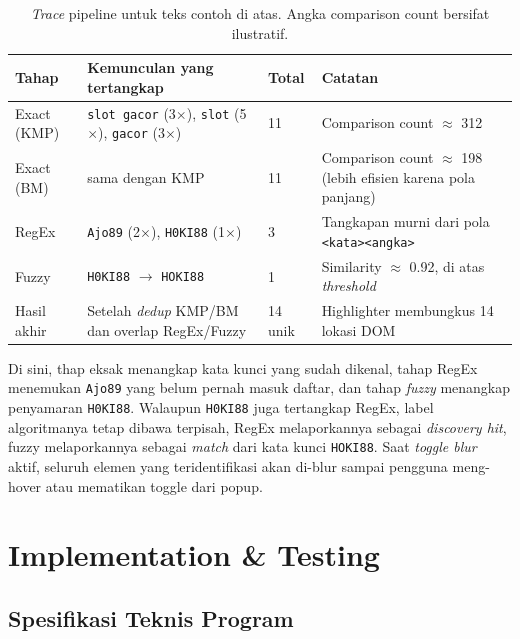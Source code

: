 \documentclass[11pt,a4paper]{article}
\begin{document}
\begin{table}[H]
    \centering
    \caption{\textit{Trace} pipeline untuk teks contoh di atas. Angka comparison count bersifat ilustratif.}
    \label{tab:case-trace}
    \begin{tabularx}{\textwidth}{p{2.4cm}|X|p{2cm}|p{3cm}}
        \toprule
        \textbf{Tahap} & \textbf{Kemunculan yang tertangkap} & \textbf{Total} & \textbf{Catatan} \\
        \midrule
        Exact (KMP) & \texttt{slot gacor} (3$\times$), \texttt{slot} (5$\times$), \texttt{gacor} (3$\times$) & 11 &
        Comparison count $\approx$ 312 \\
        Exact (BM) & sama dengan KMP & 11 & Comparison count $\approx$ 198 (lebih efisien karena pola panjang) \\
        RegEx & \texttt{Ajo89} (2$\times$), \texttt{H0KI88} (1$\times$) & 3 & Tangkapan murni dari pola \texttt{<kata><angka>} \\
        Fuzzy & \texttt{H0KI88} $\to$ \texttt{HOKI88} & 1 & Similarity $\approx$ 0.92, di atas \textit{threshold} \\
        \midrule
        Hasil akhir & Setelah \textit{dedup} KMP/BM dan overlap RegEx/Fuzzy & 14 unik &
        Highlighter membungkus 14 lokasi DOM \\
        \bottomrule
    \end{tabularx}
\end{table}

Di sini, thap eksak menangkap kata kunci yang sudah dikenal, tahap RegEx menemukan \texttt{Ajo89} yang
belum pernah masuk daftar, dan tahap \textit{fuzzy} menangkap penyamaran \texttt{H0KI88}. Walaupun \texttt{H0KI88} juga tertangkap
RegEx, label algoritmanya tetap dibawa terpisah, RegEx melaporkannya sebagai \textit{discovery hit}, fuzzy melaporkannya sebagai
\textit{match} dari kata kunci \texttt{HOKI88}. Saat \textit{toggle blur} aktif, seluruh elemen yang teridentifikasi akan
di-blur sampai pengguna meng-hover atau mematikan toggle dari popup.

\newpage
\section{Implementation \& Testing}

\subsection{Spesifikasi Teknis Program}
\end{document}
